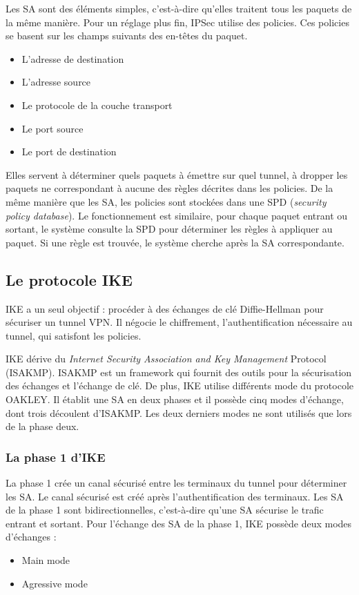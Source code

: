 Les SA sont des éléments simples, c'est-à-dire qu'elles traitent tous les paquets de la même manière. 
Pour un réglage plus fin, IPSec utilise des policies. 
Ces policies se basent sur les champs suivants des en-têtes du paquet.
\begin{itemize}
\item L'adresse de destination
\item L'adresse source
\item Le protocole de la couche transport
\item Le port source
\item Le port de destination
\end{itemize}
Elles servent à déterminer quels paquets à émettre sur quel tunnel, à dropper les paquets ne correspondant à aucune des règles décrites dans les policies. 
De la même manière que les SA, les policies sont stockées dans une SPD (\textit{security policy database}). 
Le fonctionnement est similaire, pour chaque paquet entrant ou sortant, le système consulte la SPD pour déterminer les règles à appliquer au paquet. Si une règle est trouvée, le système cherche après la SA correspondante.

\subsection{Le protocole IKE}
IKE a un seul objectif : procéder à des échanges de clé Diffie-Hellman pour sécuriser un tunnel VPN. 
Il négocie le chiffrement, l'authentification nécessaire au tunnel, qui satisfont les policies. 

IKE dérive du \textit{Internet Security Association and Key Management} Protocol (ISAKMP). 
ISAKMP est un framework qui fournit des outils pour la sécurisation des échanges et l'échange de clé. 
De plus, IKE utilise différents mode du protocole OAKLEY.
Il établit une SA en deux phases et il possède cinq modes d'échange, dont trois découlent d'ISAKMP.
Les deux derniers modes ne sont utilisés que lors de la phase deux.

\subsubsection{La phase 1 d'IKE}
La phase 1 crée un canal sécurisé entre les terminaux du tunnel pour déterminer les SA. 
Le canal sécurisé est créé après l'authentification des terminaux. 
Les SA de la phase 1 sont bidirectionnelles, c'est-à-dire qu'une SA sécurise le trafic entrant et sortant. 
Pour l'échange des SA de la phase 1, IKE possède deux modes d'échanges : 
\begin{itemize}
	\item Main mode
	\item Agressive mode
\end{itemize}

